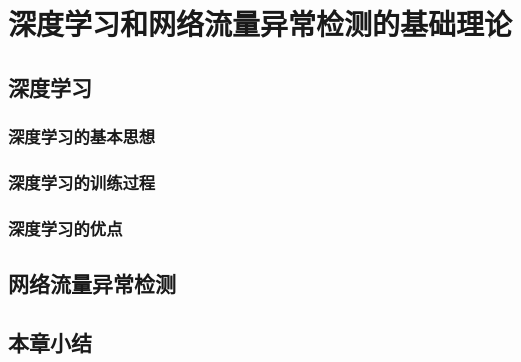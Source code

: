 
\chapter{深度学习和网络流量异常检测的基础理论}\label{chap:example}

\section{深度学习}

\subsection{深度学习的基本思想}

\subsection{深度学习的训练过程}

\subsection{深度学习的优点}

\section{网络流量异常检测}

\section{本章小结}
